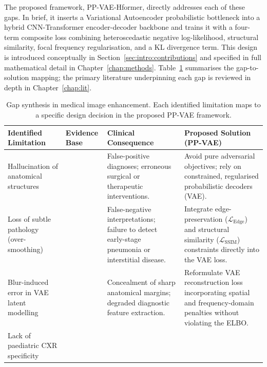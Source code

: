 \documentclass[12pt, a4paper, twoside, openright]{book}
\begin{document}
The proposed framework, PP-VAE-Hformer, directly addresses each of these gaps. In brief, it inserts a Variational Autoencoder probabilistic bottleneck into a hybrid CNN-Transformer encoder-decoder backbone and trains it with a four-term composite loss combining heteroscedastic negative log-likelihood, structural similarity, focal frequency regularisation, and a KL divergence term. This design is introduced conceptually in Section~\ref{sec:intro:contributions} and specified in full mathematical detail in Chapter~\ref{chap:methods}. Table~\ref{tab:intro:gaps} summarises the gap-to-solution mapping; the primary literature underpinning each gap is reviewed in depth in Chapter~\ref{chap:lit}.

\begin{table}[htbp]
  \centering
  \caption{Gap synthesis in medical image enhancement. Each identified limitation maps to a
  specific design decision in the proposed PP-VAE framework.}
  \label{tab:intro:gaps}
  \small
  \begin{tabularx}{\textwidth}{
    >{\raggedright\arraybackslash}p{2.8cm} 
    >{\raggedright\arraybackslash}p{2.2cm} 
    >{\raggedright\arraybackslash}X 
    >{\raggedright\arraybackslash}X
  }
    \toprule
    \textbf{Identified Limitation} &
    \textbf{Evidence Base} &
    \textbf{Clinical Consequence} &
    \textbf{Proposed Solution (PP-VAE)} \\
    \midrule
    Hallucination of anatomical structures
    & \cite{bhadra_hallucinations_2021, kc_sfrc_2024}
    & False-positive diagnoses; erroneous surgical or therapeutic interventions.
    & Avoid pure adversarial objectives; rely on constrained, regularised probabilistic decoders (VAE). \\
    \midrule
    Loss of subtle pathology (over-smoothing)
    & \cite{bredell_explicitly_2023, zhao_loss_2017}
    & False-negative interpretations; failure to detect early-stage pneumonia or interstitial disease.
    & Integrate edge-preservation ($\mathcal{L}_\mathrm{Edge}$) and structural similarity ($\mathcal{L}_\mathrm{SSIM}$) constraints directly into the VAE loss. \\
    \midrule
    Blur-induced error in VAE latent modelling
    & \cite{bredell_explicitly_2023}
    & Concealment of sharp anatomical margins; degraded diagnostic feature extraction.
    & Reformulate VAE reconstruction loss incorporating spatial and frequency-domain penalties without violating the ELBO. \\
    \midrule
    Lack of paediatric CXR specificity
    & \cite{kermany_identifying_2018, laborie_scoping_2026, strauss_image_2009}

\end{tabularx}
\end{table}
\end{document}
